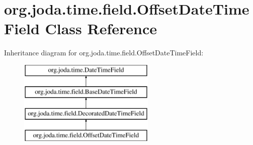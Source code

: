 \hypertarget{classorg_1_1joda_1_1time_1_1field_1_1_offset_date_time_field}{\section{org.\-joda.\-time.\-field.\-Offset\-Date\-Time\-Field Class Reference}
\label{classorg_1_1joda_1_1time_1_1field_1_1_offset_date_time_field}
}
Inheritance diagram for org.\-joda.\-time.\-field.\-Offset\-Date\-Time\-Field\-:\begin{figure}[H]
\begin{center}
\leavevmode
\includegraphics[height=4.000000cm]{classorg_1_1joda_1_1time_1_1field_1_1_offset_date_time_field}
\end{center}
\end{figure}
